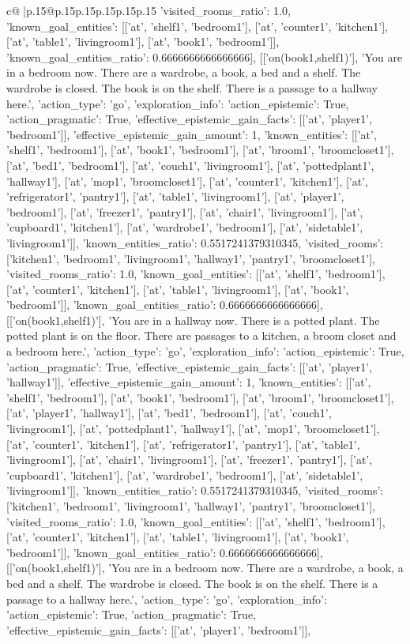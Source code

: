 \documentclass{article}
\begin{document}
{\begin{supertabular}{c@{$\;$}|p{.15\linewidth}@{}p{.15\linewidth}p{.15\linewidth}p{.15\linewidth}p{.15\linewidth}p{.15\linewidth}}
{{{'visited_rooms_ratio': 1.0, 'known_goal_entities': [['at', 'shelf1', 'bedroom1'], ['at', 'counter1', 'kitchen1'], ['at', 'table1', 'livingroom1'], ['at', 'book1', 'bedroom1']], 'known_goal_entities_ratio': 0.6666666666666666}}], [['on(book1,shelf1)'], 'You are in a bedroom now. There are a wardrobe, a book, a bed and a shelf. The wardrobe is closed. The book is on the shelf. There is a passage to a hallway here.', {'action_type': 'go', 'exploration_info': {'action_epistemic': True, 'action_pragmatic': True, 'effective_epistemic_gain_facts': [['at', 'player1', 'bedroom1']], 'effective_epistemic_gain_amount': 1, 'known_entities': [['at', 'shelf1', 'bedroom1'], ['at', 'book1', 'bedroom1'], ['at', 'broom1', 'broomcloset1'], ['at', 'bed1', 'bedroom1'], ['at', 'couch1', 'livingroom1'], ['at', 'pottedplant1', 'hallway1'], ['at', 'mop1', 'broomcloset1'], ['at', 'counter1', 'kitchen1'], ['at', 'refrigerator1', 'pantry1'], ['at', 'table1', 'livingroom1'], ['at', 'player1', 'bedroom1'], ['at', 'freezer1', 'pantry1'], ['at', 'chair1', 'livingroom1'], ['at', 'cupboard1', 'kitchen1'], ['at', 'wardrobe1', 'bedroom1'], ['at', 'sidetable1', 'livingroom1']], 'known_entities_ratio': 0.5517241379310345, 'visited_rooms': ['kitchen1', 'bedroom1', 'livingroom1', 'hallway1', 'pantry1', 'broomcloset1'], 'visited_rooms_ratio': 1.0, 'known_goal_entities': [['at', 'shelf1', 'bedroom1'], ['at', 'counter1', 'kitchen1'], ['at', 'table1', 'livingroom1'], ['at', 'book1', 'bedroom1']], 'known_goal_entities_ratio': 0.6666666666666666}}], [['on(book1,shelf1)'], 'You are in a hallway now. There is a potted plant. The potted plant is on the floor. There are passages to a kitchen, a broom closet and a bedroom here.', {'action_type': 'go', 'exploration_info': {'action_epistemic': True, 'action_pragmatic': True, 'effective_epistemic_gain_facts': [['at', 'player1', 'hallway1']], 'effective_epistemic_gain_amount': 1, 'known_entities': [['at', 'shelf1', 'bedroom1'], ['at', 'book1', 'bedroom1'], ['at', 'broom1', 'broomcloset1'], ['at', 'player1', 'hallway1'], ['at', 'bed1', 'bedroom1'], ['at', 'couch1', 'livingroom1'], ['at', 'pottedplant1', 'hallway1'], ['at', 'mop1', 'broomcloset1'], ['at', 'counter1', 'kitchen1'], ['at', 'refrigerator1', 'pantry1'], ['at', 'table1', 'livingroom1'], ['at', 'chair1', 'livingroom1'], ['at', 'freezer1', 'pantry1'], ['at', 'cupboard1', 'kitchen1'], ['at', 'wardrobe1', 'bedroom1'], ['at', 'sidetable1', 'livingroom1']], 'known_entities_ratio': 0.5517241379310345, 'visited_rooms': ['kitchen1', 'bedroom1', 'livingroom1', 'hallway1', 'pantry1', 'broomcloset1'], 'visited_rooms_ratio': 1.0, 'known_goal_entities': [['at', 'shelf1', 'bedroom1'], ['at', 'counter1', 'kitchen1'], ['at', 'table1', 'livingroom1'], ['at', 'book1', 'bedroom1']], 'known_goal_entities_ratio': 0.6666666666666666}}], [['on(book1,shelf1)'], 'You are in a bedroom now. There are a wardrobe, a book, a bed and a shelf. The wardrobe is closed. The book is on the shelf. There is a passage to a hallway here.', {'action_type': 'go', 'exploration_info': {'action_epistemic': True, 'action_pragmatic': True, 'effective_epistemic_gain_facts': [['at', 'player1', 'bedroom1']], }}}
\end{supertabular}}
\end{document}

